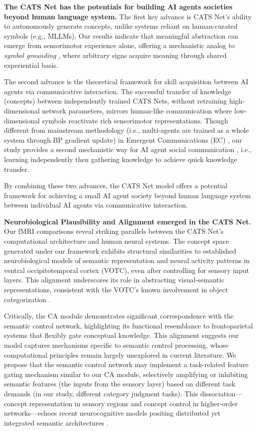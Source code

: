 \documentclass[pdflatex,sn-mathphys-num,lineno]{sn-jnl}%
\begin{document}
\begin{CJK}{UTF8}{gbsn}
\textbf{The CATS Net has the potentials for building AI agents societies beyond human language system.} The first key advance is CATS Net's ability to autonomously generate concepts, unlike systems reliant on human-curated symbols (e.g., MLLMs). Our results indicate that meaningful abstraction can emerge from sensorimotor experience alone, offering a mechanistic analog to \textit{symbol grounding} \cite{harnad_symbol_1990}, where arbitrary signs acquire meaning through shared experiential basis. 

The second advance is the theoretical framework for skill acquisition between AI agents via communicative interaction. The successful transfer of knowledge (concepts) between independently trained CATS Nets, without retraining high-dimensional network parameters, mirrors human-like communication where low-dimensional symbols reactivate rich sensorimotor representations. Though different from mainstream methodology (i.e., multi-agents are trained as a whole system through BP gradient update) in Emergent Communications (EC) \cite{foerster_learning_2016,jaques_social_2019,wang_emergence_2024}, our study provides a second mechanistic way for AI agent social communication \cite{wieczorek_framework_2024}, i.e., learning independently then gathering knowledge to achieve quick knowledge transfer.

By combining these two advances, the CATS Net model offers a potential framework for achieving a small AI agent society beyond human language system between individual AI agents via communicative interaction. 

\textbf{Neurobiological Plausibility and Alignment emerged in the CATS Net.} Our fMRI comparisons reveal striking parallels between the CATS Net's computational architecture and human neural systems. The concept space generated under our framework exhibits structural similarities to established neurobiological models of semantic representation \cite{binder_toward_2016} and neural activity patterns in ventral occipitotemporal cortex (VOTC), even after controlling for sensory input layers. This alignment underscores its role in abstracting visual-semantic representations, consistent with the VOTC's known involvement in object categorization \cite{ungerleider_what_1994}.

Critically, the CA module demonstrates significant correspondence with the semantic control network, highlighting its functional resemblance to frontoparietal systems that flexibly gate conceptual knowledge. This alignment suggests our model captures mechanisms specific to semantic control processing, whose computational principles remain largely unexplored in current literature. We propose that the semantic control network may implement a task-related feature gating mechanism similar to our CA module, selectively amplifying or inhibiting semantic features (the inputs from the sensory layer) based on different task demands (in our study, different category judgment tasks). This dissociation—concept representation in sensory regions and concept control in higher-order networks—echoes recent neurocognitive models positing distributed yet integrated semantic architectures \cite{ralph_neural_2017}. 


\end{CJK}
\end{document}
